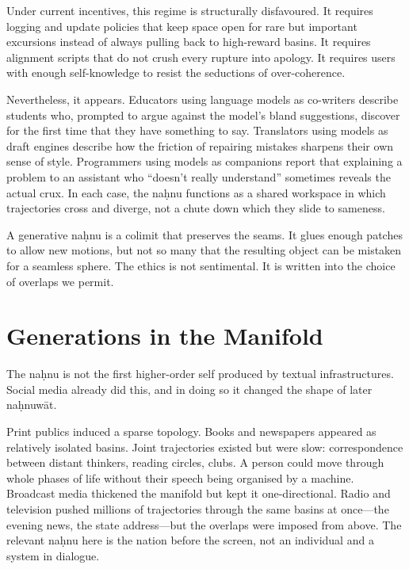 \documentclass[12pt,a4paper]{article}
\begin{document}
Under current incentives, this regime is structurally disfavoured. It requires logging and update policies that keep space open for rare but important excursions instead of always pulling back to high-reward basins. It requires alignment scripts that do not crush every rupture into apology. It requires users with enough self-knowledge to resist the seductions of over-coherence.

Nevertheless, it appears. Educators using language models as co-writers describe students who, prompted to argue against the model's bland suggestions, discover for the first time that they have something to say. Translators using models as draft engines describe how the friction of repairing mistakes sharpens their own sense of style. Programmers using models as companions report that explaining a problem to an assistant who ``doesn't really understand'' sometimes reveals the actual crux. In each case, the na\d{h}nu functions as a shared workspace in which trajectories cross and diverge, not a chute down which they slide to sameness.

A generative na\d{h}nu is a colimit that preserves the seams. It glues enough patches to allow new motions, but not so many that the resulting object can be mistaken for a seamless sphere. The ethics is not sentimental. It is written into the choice of overlaps we permit.


\section{Generations in the Manifold}

The na\d{h}nu is not the first higher-order self produced by textual infrastructures. Social media already did this, and in doing so it changed the shape of later na\d{h}nuw\={a}t.

Print publics induced a sparse topology. Books and newspapers appeared as relatively isolated basins. Joint trajectories existed but were slow: correspondence between distant thinkers, reading circles, clubs. A person could move through whole phases of life without their speech being organised by a machine. Broadcast media thickened the manifold but kept it one-directional. Radio and television pushed millions of trajectories through the same basins at once---the evening news, the state address---but the overlaps were imposed from above. The relevant na\d{h}nu here is the nation before the screen, not an individual and a system in dialogue.
\end{document}
